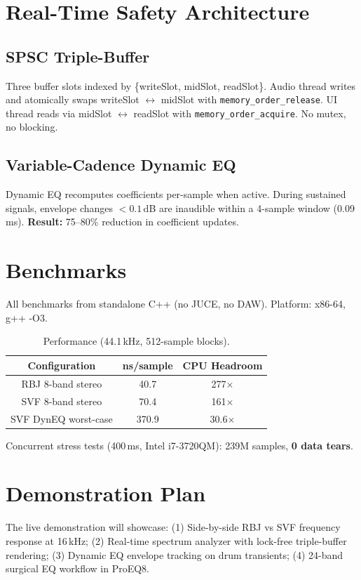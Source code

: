 \documentclass[twoside,a4paper]{article}
\begin{document}
\section{Real-Time Safety Architecture}
\subsection{SPSC Triple-Buffer}
Three buffer slots indexed by \{writeSlot, midSlot, readSlot\}. Audio thread writes and atomically swaps writeSlot $\leftrightarrow$ midSlot with \texttt{memory\_order\_release}. UI thread reads via midSlot $\leftrightarrow$ readSlot with \texttt{memory\_order\_acquire}. No mutex, no blocking.

\subsection{Variable-Cadence Dynamic EQ}
Dynamic EQ recomputes coefficients per-sample when active. During sustained signals, envelope changes $< 0.1$\,dB are inaudible within a 4-sample window (0.09\,ms). \textbf{Result:} 75--80\% reduction in coefficient updates.

\section{Benchmarks}
All benchmarks from standalone C++ (no JUCE, no DAW). Platform: x86-64, g++ -O3.

\begin{table}[ht]
  \caption{Performance (44.1\,kHz, 512-sample blocks).}
  \centering
  \begin{tabular}{ccc}\toprule
    Configuration & ns/sample & CPU Headroom \\\midrule
    RBJ 8-band stereo & 40.7 & 277$\times$ \\
    SVF 8-band stereo & 70.4 & 161$\times$ \\
    SVF DynEQ worst-case & 370.9 & 30.6$\times$ \\\bottomrule
  \end{tabular}
\end{table}

Concurrent stress tests (400\,ms, Intel i7-3720QM): 239M samples, \textbf{0 data tears}.

\section{Demonstration Plan}
The live demonstration will showcase: (1) Side-by-side RBJ vs SVF frequency response at 16\,kHz; (2) Real-time spectrum analyzer with lock-free triple-buffer rendering; (3) Dynamic EQ envelope tracking on drum transients; (4) 24-band surgical EQ workflow in ProEQ8.
\end{document}
